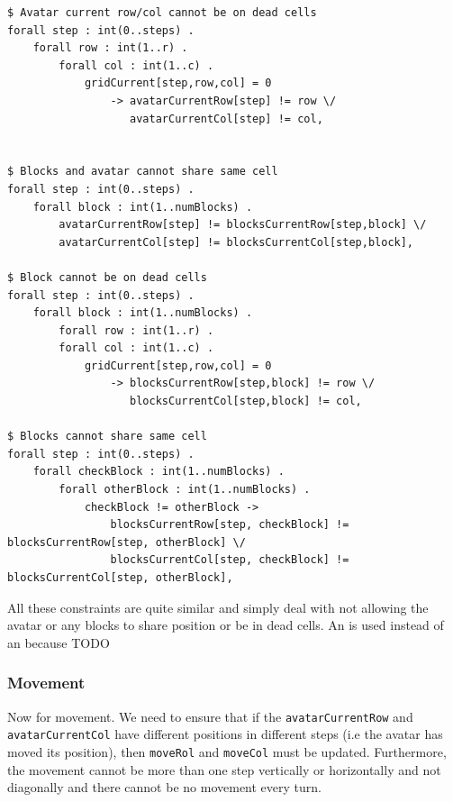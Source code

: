 \documentclass{article}
\begin{document}
\begin{lstlisting}[caption={Constraints to prevent invalid game states}, captionpos=b]
$ Avatar current row/col cannot be on dead cells
forall step : int(0..steps) .
    forall row : int(1..r) .
        forall col : int(1..c) .
	    	gridCurrent[step,row,col] = 0 
	    		-> avatarCurrentRow[step] != row \/ 
	    		   avatarCurrentCol[step] != col,


$ Blocks and avatar cannot share same cell
forall step : int(0..steps) .
    forall block : int(1..numBlocks) .
        avatarCurrentRow[step] != blocksCurrentRow[step,block] \/
		avatarCurrentCol[step] != blocksCurrentCol[step,block],

$ Block cannot be on dead cells
forall step : int(0..steps) .
    forall block : int(1..numBlocks) .
        forall row : int(1..r) .
	    forall col : int(1..c) .
	        gridCurrent[step,row,col] = 0 
	        	-> blocksCurrentRow[step,block] != row \/
				   blocksCurrentCol[step,block] != col,

$ Blocks cannot share same cell				       
forall step : int(0..steps) .
    forall checkBlock : int(1..numBlocks) .
        forall otherBlock : int(1..numBlocks) .
	    	checkBlock != otherBlock ->
	        	blocksCurrentRow[step, checkBlock] != blocksCurrentRow[step, otherBlock] \/
				blocksCurrentCol[step, checkBlock] != blocksCurrentCol[step, otherBlock],
\end{lstlisting}
All these constraints are quite similar and simply deal with not allowing the avatar or any blocks to share position or be in dead cells. An \vee is used instead of an \wedge because TODO


\subsubsection{Movement}
Now for movement. We need to ensure that if the \texttt{avatarCurrentRow} and \texttt{avatarCurrentCol} have different positions in different steps (i.e the avatar has moved its position), then \texttt{moveRol} and \texttt{moveCol} must be updated. Furthermore, the movement cannot be more than one step vertically or horizontally and not diagonally and there cannot be no movement every turn.
\end{document}
